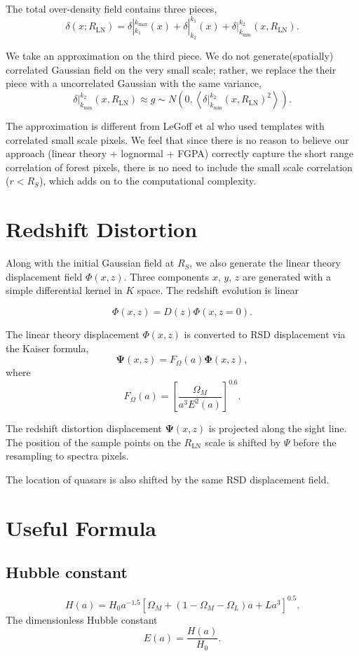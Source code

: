 \documentclass{paper}
\begin{document}
    The total over-density field contains three pieces,
    \[
        \delta(x; R_\mathrm{LN}) =
        \delta|_{k_1}^{k_\mathrm{max}}(x) +
        \delta|_{k_2}^{k_1}(x) +
        \delta|_{k_\mathrm{min}}^{k_2}(x, R_\mathrm{LN}).
    \]

    We take an approximation on the third piece. We do not
    generate(spatially) correlated Gaussian field on the
    very small scale; rather, we replace the their piece
    with a uncorrelated Gaussian with the same variance,
    \[
        \delta|_{k_\mathrm{min}}^{k_2}(x, R_\mathrm{LN})
        \approx g \sim N(0, \left<\delta|_{k_\mathrm{min}}^{k_2}(x,
        R_\mathrm{LN})^2\right>).
    \]
    
    The approximation is different from LeGoff et al who
    used templates with correlated small scale pixels.
    We feel that since there is no reason to believe our
    approach (linear theory + lognormal + FGPA) correctly capture the
    short range correlation of forest pixels, there is no need to
    include the small scale correlation ($r < R_S$), which adds on to the
    computational complexity.

\section{Redshift Distortion}
Along with the initial Gaussian field at $R_S$, we also generate the
linear theory displacement field $\Phi(x, z)$. Three components $x$,
$y$, $z$ are generated with a simple differential kernel in $K$ space.
The redshift evolution is linear

\[
    \Phi(x, z) = D(z) \Phi(x, z=0).
\]

The linear theory displacement $\Phi(x, z)$ is converted to RSD
displacement via the Kaiser formula,
\[
    \mathbf{\Psi}(x, z) = F_\Omega(a) \mathbf{\Phi}(x, z),
\]
where
\[
    F_\Omega(a) = \left[\frac{\Omega_M}{a^3 E^2(a)}\right]^{0.6} .
\]

The redshift distortion displacement $\mathbf{\Psi}(x, z)$ is projected along the
sight line. The position of the sample points on the $R_\mathrm{LN}$
scale is shifted by $\Psi$ before the resampling to spectra pixels.

The location of quasars is also shifted by the same RSD displacement
field.

\appendix
\section{Useful Formula}
\subsection{Hubble constant}
\[
    H(a) = H_0 a^{-1.5} \left[\Omega_M + 
           (1 - \Omega_M - \Omega_L) a +
       L a^3 \right] ^ {0.5}  .
\] 
The dimensionless Hubble constant
\[
    E(a) = \frac{H(a)}{H_0} .
\]
\end{document}
